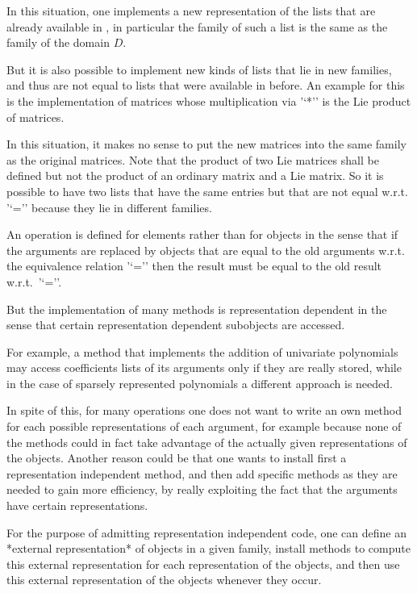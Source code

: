 In this situation, one implements a new representation of the
lists that are already available in {\GAP},
in particular the family of such a list is the same as the family of
the domain $D$.

But it is also possible to implement new kinds of lists that lie in
new families, and thus are not equal to lists that were available
in {\GAP} before.
An example for this is the implementation of matrices
whose multiplication via '`*'' is the Lie product of matrices.

In this situation, it makes no sense to put the new matrices into the
same family as the original matrices.
Note that the product of two Lie matrices shall be defined but not the
product of an ordinary matrix and a Lie matrix.
So it is possible to have two lists that have the same entries but that
are not equal w.r.t. '`='' because they lie in different families.



An operation is defined for elements rather than for objects in the sense
that if the arguments are replaced by objects that are equal to the old
arguments w.r.t. the equivalence relation '`='' then the result must be
equal to the old result w.r.t.~'`=''.

But the implementation of many methods is representation dependent in the
sense that certain representation dependent subobjects are accessed.

For example, a method that implements the addition of univariate
polynomials may access coefficients lists of its arguments
only if they are really stored,
while in the case of sparsely represented polynomials a different approach
is needed.

In spite of this, for many operations one does not want to write an own
method for each possible representations of each argument,
for example because none of the methods could in fact take advantage
of the actually given representations of the objects.
Another reason could be that one wants to install first a representation
independent method, and then add specific methods as they are needed to
gain more efficiency, by really exploiting the fact that the arguments
have certain representations.

For the purpose of admitting representation independent code,
one can define an *external representation* of objects in a given family,
install methods to compute this external representation for each
representation of the objects,
and then use this external representation of the objects whenever they
occur.

